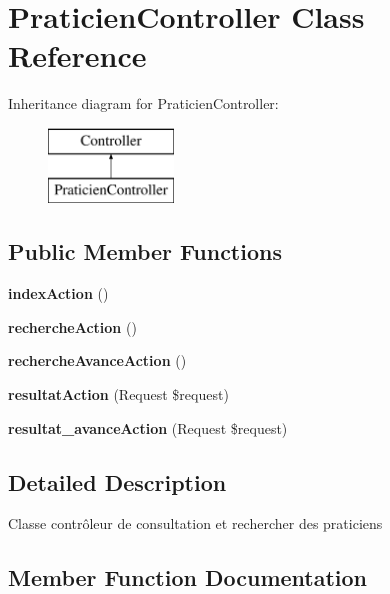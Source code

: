 \section{Praticien\+Controller Class Reference}
\label{class_c_r_1_1_g_s_b_r_bundle_1_1_controller_1_1_praticien_controller}
Inheritance diagram for Praticien\+Controller\+:\begin{figure}[H]
\begin{center}
\leavevmode
\includegraphics[height=2.000000cm]{class_c_r_1_1_g_s_b_r_bundle_1_1_controller_1_1_praticien_controller}
\end{center}
\end{figure}
\subsection*{Public Member Functions}
\begin{DoxyCompactItemize}
\item 
{\bf index\+Action} ()
\item 
{\bf recherche\+Action} ()
\item 
{\bf recherche\+Avance\+Action} ()
\item 
{\bf resultat\+Action} (Request \$request)
\item 
{\bf resultat\+\_\+avance\+Action} (Request \$request)
\end{DoxyCompactItemize}


\subsection{Detailed Description}
Classe contrôleur de consultation et rechercher des praticiens 

\subsection{Member Function Documentation}
